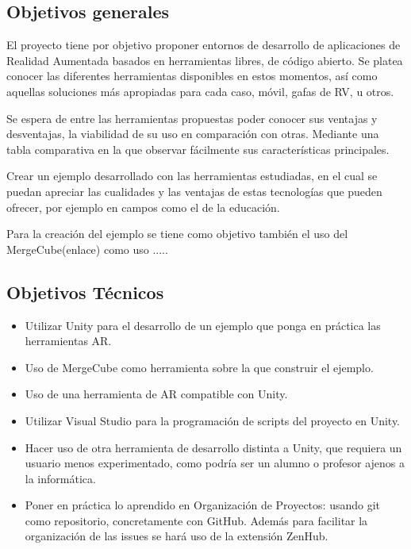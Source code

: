 
\subsection{Objetivos generales}
El proyecto tiene por objetivo proponer entornos de desarrollo de aplicaciones de Realidad Aumentada basados en herramientas libres, de código abierto. Se platea conocer las diferentes herramientas disponibles en estos momentos, así como aquellas soluciones más apropiadas para cada caso, móvil, gafas de RV, u otros.

Se espera de entre las herramientas propuestas poder conocer sus ventajas y desventajas, la viabilidad de su uso en comparación con otras. Mediante una tabla comparativa en la que observar fácilmente sus características principales.

Crear un ejemplo desarrollado con las herramientas estudiadas, en el cual se puedan apreciar las cualidades y las ventajas de estas tecnologías que pueden ofrecer, por ejemplo en campos como el de la educación.

Para la creación del ejemplo se tiene como objetivo también el uso del MergeCube(enlace) como uso .....

\subsection{Objetivos Técnicos}
\begin{itemize}
\item Utilizar Unity para el desarrollo de un ejemplo que ponga en práctica las herramientas AR.
\item Uso de MergeCube como herramienta sobre la que construir el ejemplo.
\item Uso de una herramienta de AR compatible con Unity.
\item Utilizar Visual Studio para la programación de scripts del proyecto en Unity.
\item Hacer uso de otra herramienta de desarrollo distinta a Unity, que requiera un usuario menos experimentado, como podría ser un alumno o profesor ajenos a la informática.
\item Poner en práctica lo aprendido en Organización de Proyectos: usando git como repositorio, concretamente con GitHub. Además para facilitar la organización de las issues  se hará uso de la extensión ZenHub.

	
\end{itemize}


